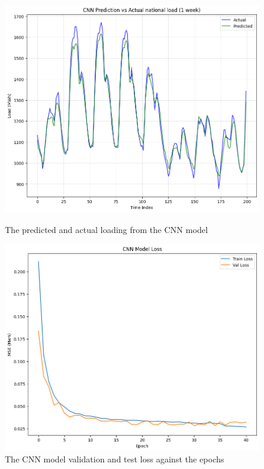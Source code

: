 \begin{figure}[h]
	\centering
	\begin{minipage}[b]{0.46\linewidth}
	\includegraphics[width=\linewidth]{Chapters/images/results/cnn_predictionvsactual}
	\caption{The predicted and actual loading from the CNN model}
	\label{fig:cnnpredictionvsactual}
	\end{minipage}
	\begin{minipage}[b]{0.46\linewidth}
	\includegraphics[width=\linewidth]{Chapters/images/results/CNN_model_loss}
	\caption{The CNN model validation and test loss against the epochs}
	\label{fig:cnnmodelloss}
	\end{minipage}
\end{figure}

